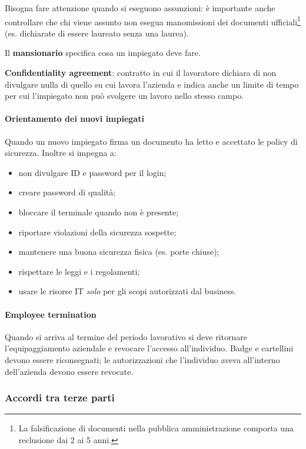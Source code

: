 Bisogna fare attenzione quando si eseguono assunzioni: è
importante anche controllare che chi viene assunto non esegua manomissioni dei
documenti ufficiali\footnote{La falsificazione di documenti nella pubblica
amministrazione comporta una reclusione dai 2 ai 5 anni.} (es. dichiarate di
essere laureato senza una laurea).

Il \textbf{mansionario} specifica cosa un impiegato deve fare.

\textbf{Confidentiality agreement}: contratto in cui il lavoratore dichiara di 
non divulgare nulla di quello su cui lavora l'azienda e indica anche un limite 
di tempo per cui l'impiegato non può svolgere un lavoro nello stesso campo.


\paragraph{Orientamento dei nuovi impiegati}

Quando un nuovo impiegato firma un documento ha letto e accettato le policy di
sicurezza. Inoltre si impegna a:
\begin{itemize}
\item non divulgare ID e password per il login;
\item creare password di qualità;
\item bloccare il terminale quando non è presente;
\item riportare violazioni della sicurezza sospette;
\item mantenere una buona sicurezza fisica (es. porte chiuse);
\item rispettare le leggi e i regolamenti;
\item usare le risorse IT \emph{solo} per gli scopi autorizzati dal
business.
\end{itemize}

\paragraph{Employee termination}

Quando si arriva al termine del periodo lavorativo si deve ritornare
l'equipaggiamento aziendale e revocare l'accesso all'individuo. Badge e
cartellini devono essere riconsegnati; le autorizzazioni che l'individuo aveva
all'interno dell'azienda devono essere revocate.

\subsubsection{Accordi tra terze parti}

